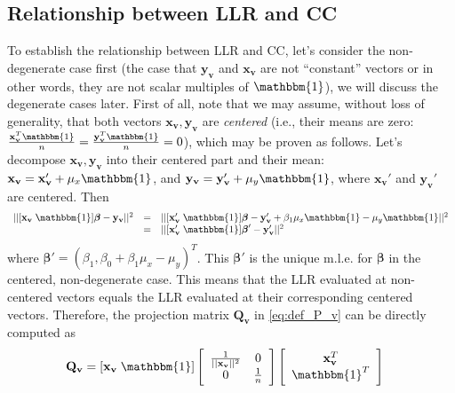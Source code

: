 \subsection{Relationship between LLR and CC}
To establish the relationship between LLR and CC, let's consider the non-degenerate case first (the case that $\mathbf{y}_{\mathbf{v}}$ and $\mathbf{x}_{\mathbf{v}}$ are not ``constant'' vectors or in other words, they are not scalar multiples of $\mathbbm{1}$), we will discuss the degenerate cases later. First of all, note that we may assume, without loss of generality, that both vectors $\mathbf{x}_{\mathbf{v}}, \mathbf{y}_{\mathbf{v}}$ are \emph{centered} (i.e., their means are zero: $\frac{\mathbf{x}_{\mathbf{v}}^{T}\mathbbm{1}}{n} = \frac{\mathbf{y}_{\mathbf{v}}^{T}\mathbbm{1}}{n} = 0$), which may be proven as follows. Let's decompose $\mathbf{x}_{\mathbf{v}}, \mathbf{y}_{\mathbf{v}}$ into their centered part and their mean: $\mathbf{x}_{\mathbf{v}} = \mathbf{x}_{\mathbf{v}}' + \mu_{x}\mathbbm{1}$, and $\mathbf{y}_{\mathbf{v}} = \mathbf{y}_{\mathbf{v}}' + \mu_{y}\mathbbm{1}$, where $\mathbf{x}_{\mathbf{v}}'$ and $\mathbf{y}_{\mathbf{v}}'$ are centered. Then
\begin{displaymath}
    \begin{array}{lcl}
        ||[\mathbf{x}_{\mathbf{v}} \; \mathbbm{1}]\boldsymbol{\beta} - \mathbf{y}_{\mathbf{v}}||^{2} &=& ||[\mathbf{x}_{\mathbf{v}}' \; \mathbbm{1}]\boldsymbol{\beta} - \mathbf{y}_{\mathbf{v}}' + \beta_{1}\mu_{x}\mathbbm{1} - \mu_{y}\mathbbm{1}||^{2}\\
        &=&||[\mathbf{x}_{\mathbf{v}}' \; \mathbbm{1}]\boldsymbol{\beta}' - \mathbf{y}_{\mathbf{v}}'||^{2}
    \end{array}
\end{displaymath}
where $\boldsymbol{\beta}' = (\beta_{1}, \beta_{0} + \beta_{1}\mu_{x} - \mu_{y})^{T}$. This $\boldsymbol{\beta}'$ is the unique m.l.e. for $\boldsymbol{\beta}$ in the centered, non-degenerate case. This means that the LLR evaluated at non-centered vectors equals the LLR evaluated at their corresponding centered vectors. Therefore, the projection matrix $\mathbf{Q}_{\mathbf{v}}$ in \eqref{eq:def_P_v} can be directly computed as
\begin{align*}
    \mathbf{Q}_{\mathbf{v}} &= [\mathbf{x}_{\mathbf{v}} \; \mathbbm{1}]
    \left[\begin{array}{cc}
        \frac{1}{||\mathbf{x}_{\mathbf{v}}||^{2}} & 0\\
        0 & \frac{1}{n}
    \end{array}\right]
    \left[\begin{array}{c}
        \mathbf{x}_{\mathbf{v}}^{T}\\
        \mathbbm{1}^{T}
    \end{array}\right]
\end{align*}
